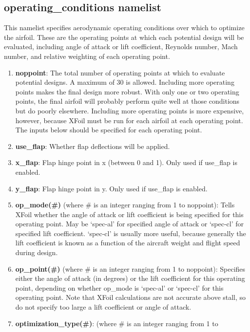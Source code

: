 \documentclass[11pt]{article}
\begin{document}
\subsection{operating\_conditions namelist}

This namelist specifies aerodynamic operating conditions over which to optimize the
airfoil.  These are the operating points at which each potential design will be evaluated,
including angle of attack or lift coefficient, Reynolds number, Mach number, and
relative weighting of each operating point.

\begin{enumerate}
\item{\textbf{noppoint}: The total number of operating points at which to evaluate
potential designs.  A maximum of 30 is allowed.  Including more operating points makes the
final design more robust.  With only one or two operating points, the final airfoil will
probably perform quite well at those conditions but do poorly elsewhere.  Including more
operating points is more expensive, however, because XFoil must be run for each airfoil at
each operating point.  The inputs below should be specified for each operating point.}
\item{\textbf{use\_flap}: Whether flap deflections will be applied.}
\item{\textbf{x\_flap}: Flap hinge point in x (between 0 and 1). Only used if use\_flap is
enabled.}
\item{\textbf{y\_flap}: Flap hinge point in y. Only used if use\_flap is enabled.}
\item{\textbf{op\_mode(\#)} (where \# is an integer ranging from 1 to noppoint): Tells
XFoil whether the angle of attack or lift coefficient is being specified for this
operating point.  May be `spec-al' for specified angle of attack or `spec-cl' for
specified lift coefficient. `spec-cl' is usually more useful, because generally the lift
coefficient is known as a function of the aircraft weight and flight speed during design.}
\item{\textbf{op\_point(\#)} (where \# is an integer ranging from 1 to noppoint):
Specifies either the angle of attack (in degrees) or the lift coefficient for this
operating point, depending on whether op\_mode is `spec-al' or `spec-cl' for this
operating point.  Note that XFoil calculations are not accurate above stall, so do not
specify too large a lift coefficient or angle of attack.}
\item{\textbf{optimization\_type(\#)}: (where \# is an integer ranging from 1 to
}
\end{enumerate}
\end{document}
